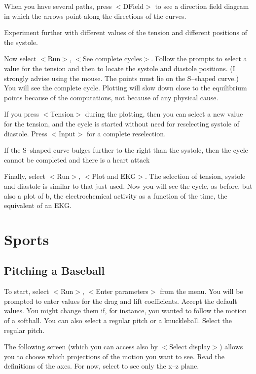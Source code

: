    When you have several paths, press $<$DField$>$ to see a direction
field diagram in which the arrows point along the directions of the
curves.

   Experiment further with different values of the tension and
different positions of the systole.

   Now select $<$Run$>$, $<$See complete cycles$>$. Follow the prompts to
select a value for the tension and then to locate the systole and
diastole positions. (I strongly advise using the mouse. The points
must lie on the S--shaped curve.) You will see the complete cycle.
Plotting will slow down close to the equilibrium points because of
the computations, not because of any physical cause.

   If you press $<$Tension$>$ during the plotting, then you can select
a new value for the tension, and the cycle is started without need
for reselecting systole of diastole. Press $<$Input$>$ for a complete
reselection.

   If the S--shaped curve bulges further to the right than the systole,
then the cycle cannot be completed and there is a heart attack

   Finally, select $<$Run$>$, $<$Plot and EKG$>$. The selection of tension,
systole and diastole is similar to that just used. Now you will see
the cycle, as before, but also a plot of b, the electrochemical
activity as a function of the time, the equivalent of an EKG.


\section{Sports}


\subsection{Pitching a Baseball}

   To start, select $<$Run$>$, $<$Enter parameters$>$ from the menu. You
will be prompted to enter values for the drag and lift coefficients.
Accept the default values. You might change them if, for instance, you
wanted to follow the motion of a softball.  You can also select a
regular pitch or a knuckleball. Select the regular pitch.

   The following screen (which you can access also by $<$Select display$>$)
allows you to choose which projections of the motion you want to
see. Read the definitions of the axes. For now, select to see only
the x--z plane.

